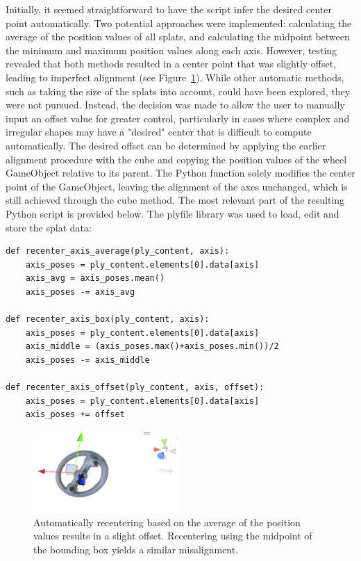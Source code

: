 \documentclass[12pt]{article}
\begin{document}
Initially, it seemed straightforward to have the script infer the desired center point automatically. Two potential approaches were implemented: calculating the average of the position values of all splats, and calculating the midpoint between the minimum and maximum position values along each axis. However, testing revealed that both methods resulted in a center point that was slightly offset, leading to imperfect alignment (see Figure~\ref{fig:left_av}). While other automatic methods, such as taking the size of the splats into account, could have been explored, they were not pursued. Instead, the decision was made to allow the user to manually input an offset value for greater control, particularly in cases where complex and irregular shapes may have a "desired" center that is difficult to compute automatically. The desired offset can be determined by applying the earlier alignment procedure with the cube and copying the position values of the wheel GameObject relative to its parent. The Python function solely modifies the center point of the GameObject, leaving the alignment of the axes unchanged, which is still achieved through the cube method. The most relevant part of the resulting Python script is provided below. The plyfile library \parencite{Plyfile} was used to load, edit and store the splat data:
\begin{lstlisting}[tabsize=2,caption=Three potential functions for recentering the Gaussian Splat. The desired function is called on each of the three axes., label=code:re_center,breaklines=true,breakatwhitespace=true,basicstyle=\ttfamily\footnotesize]
def recenter_axis_average(ply_content, axis):
	axis_poses = ply_content.elements[0].data[axis]
	axis_avg = axis_poses.mean()
	axis_poses -= axis_avg

def recenter_axis_box(ply_content, axis):
	axis_poses = ply_content.elements[0].data[axis]
	axis_middle = (axis_poses.max()+axis_poses.min())/2
	axis_poses -= axis_middle

def recenter_axis_offset(ply_content, axis, offset):
	axis_poses = ply_content.elements[0].data[axis]
	axis_poses += offset

\end{lstlisting}
\begin{figure}[h!]
	\centering
	\includegraphics[width=0.5\textwidth]{Images/left_wheel_av.png}
	\caption{Automatically recentering based on the average of the position values results in a slight offset. Recentering using the midpoint of the bounding box yields a similar misalignment.}
	\label{fig:left_av}
\end{figure}
\FloatBarrier
\noindent
\end{document}
